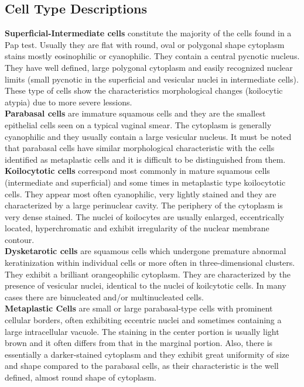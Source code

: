 \documentclass[ms,electronic,oneside,twosidetoc,letterpaper,chaptercenter,parttop]{byumsphd}
\begin{document}
\begin{appendices}
  \chapter{Cell Type Descriptions}

  \noindent \textbf{Superficial-Intermediate cells} constitute the majority of the cells found in a Pap test. Usually they are flat with round, oval or polygonal shape cytoplasm stains mostly eosinophilic or cyanophilic. They contain a central pycnotic nucleus. They have well defined, large polygonal cytoplasm and easily recognized nuclear limits (small pycnotic in the superficial and vesicular nuclei in intermediate cells). These type of cells show the characteristics morphological changes (koilocytic atypia) due to more severe lessions.
  \\ \textbf{Parabasal cells} are immature squamous cells and they are the smallest epithelial cells seen on a typical vaginal smear. The cytoplasm is generally cyanophilic and they usually contain a large vesicular nucleus. It must be noted that parabasal cells have similar morphological characteristic with the cells identified as metaplastic cells and it is difficult to be distinguished from them.    
  \\ \textbf{Koilocytotic cells} correspond most commonly in mature squamous cells (intermediate and superficial) and some times in metaplastic type koilocytotic cells. They appear most often cyanophilic, very lightly stained and they are characterized by a large perinuclear cavity. The periphery of the cytoplasm is very dense stained. The nuclei of koilocytes are usually enlarged, eccentrically located, hyperchromatic and exhibit irregularity of the nuclear membrane contour. 
  \\ \textbf{Dysketarotic cells} are squamous cells which undergone premature abnormal keratinization within individual cells or more often in three-dimensional clusters. They exhibit a brilliant orangeophilic cytoplasm. They are characterized by the presence of vesicular nuclei, identical to the nuclei of koilcytotic cells. In many cases there are binucleated and/or multinucleated cells.
  \\ \textbf{Metaplastic Cells} are small or large parabasal-type cells with prominent cellular borders, often exhibiting eccentric nuclei and sometimes containing a large intracellular vacuole. The staining in the center portion is usually light brown and it often differs from that in the marginal portion. Also, there is essentially a darker-stained cytoplasm and they exhibit great uniformity of size and shape compared to the parabasal cells, as their characteristic is the well defined, almost round shape of cytoplasm.\cite{sipakmed}

\end{appendices}



\end{document}
